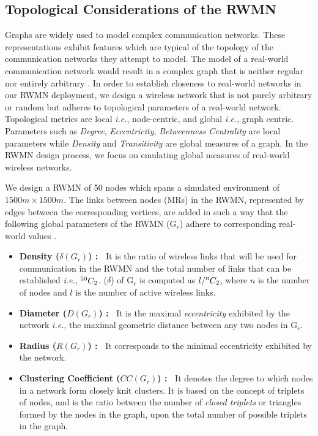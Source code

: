 \documentclass[conference]{IEEEtran}
\begin{document}
\subsection{Topological Considerations of the RWMN}
Graphs are widely used to model complex communication networks. These representations exhibit features which are typical of the topology of the communication networks they attempt to model. The model of a real-world communication network would result in a complex graph that is neither regular nor entirely arbitrary \cite{Complex}. In order to establish closeness to real-world networks in our RWMN deployment, we design a wireless network that is not purely arbitrary or random but adheres to topological parameters of a real-world network. Topological metrics are local \emph{i.e.}, node-centric, and global \emph{i.e.}, graph centric. Parameters such as \textit{Degree}, \textit{Eccentricity}, \textit{Betweenness Centrality} are local parameters while \textit{Density} and \textit{Transitivity} are global measures of a graph. In the RWMN design process, we focus on emulating global measures of real-world wireless networks.

We design a RWMN of 50 nodes which spans a simulated environment of $1500m \times 1500m$. The links between nodes (MRs) in the RWMN, represented by edges between the corresponding vertices, are added in such a way that the following global parameters of the RWMN (G$_r$) adhere to corresponding real-world values \cite{TOPO}. 
\begin{itemize}
 \item \textbf{Density ($\delta(G_r)$) :~} It is the ratio of wireless links that will be used for communication in the RWMN and the total number of links that can be established \emph{i.e.}, $\textsuperscript {50} C_2$. ($\delta$) of G$_r$ is computed as $l/\textsuperscript n C_2$, where $n$ is the number of nodes and $l$ is the number of active wireless links.
 \item \textbf{Diameter ($D(G_r)$) :~} It is the maximal \textit{eccentricity} exhibited by the network \emph{i.e.}, the maximal geometric distance between any two nodes in  G$_r$.
 \item \textbf{Radius ($R(G_r)$) :~} It corresponds to the minimal eccentricity exhibited by the network.
 \item \textbf{Clustering Coefficient ($CC(G_r)$) :~} It denotes the degree to which nodes in a network form closely knit clusters. It is based on the concept of triplets of nodes, and is the ratio between the number of \textit{closed triplets} or triangles formed by the nodes in the graph, upon the total number of possible triplets in the graph.
\end{itemize}
\end{document}
